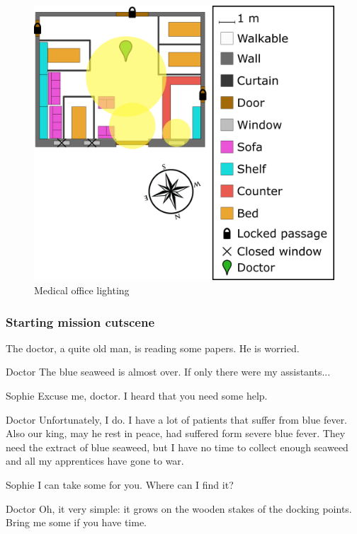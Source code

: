 \begin{figure}[H]
  \centering
  \includegraphics[width=\textwidth]{../Images/Maps/medicalOfficeLighting}
  \caption{Medical office lighting}
\end{figure}

\subsubsection*{Starting mission cutscene}
\begin{screenplay}

The doctor, a quite old man, is reading some papers. He is worried.

\begin{dialogue}[to himself]{Doctor}
The blue seaweed is almost over. If only there were my assistants...
\end{dialogue}

\begin{dialogue}{Sophie}
Excuse me, doctor. I heard that you need some help.
\end{dialogue}

\begin{dialogue}{Doctor}
Unfortunately, I do. I have a lot of patients that suffer from blue fever. Also our king, may he rest in peace, had suffered form severe blue fever. They need the extract of blue seaweed, but I have no time to collect enough seaweed and all my apprentices have gone to war.
\end{dialogue}

\begin{dialogue}{Sophie}
I can take some for you. Where can I find it?
\end{dialogue}

\begin{dialogue}{Doctor}
Oh, it very simple: it grows on the wooden stakes of the docking points. Bring me some if you have time.
\end{dialogue}

\end{screenplay}

